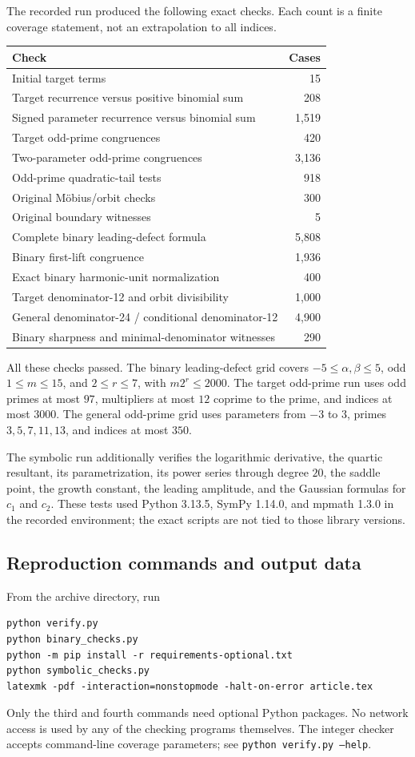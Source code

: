 \documentclass[11pt,a4paper]{article}
\numberwithin{equation}{section}
\theoremstyle{definition}
\theoremstyle{remark}
\begin{document}
The recorded run produced the following exact checks. Each count is a finite
coverage statement, not an extrapolation to all indices.
\begin{center}
\small
\begin{tabular}{p{}r}
\toprule
Check & Cases\\
\midrule
Initial target terms &15\\
Target recurrence versus positive binomial sum &208\\
Signed parameter recurrence versus binomial sum &1,519\\
Target odd-prime congruences &420\\
Two-parameter odd-prime congruences &3,136\\
Odd-prime quadratic-tail tests &918\\
Original M\"obius/orbit checks &300\\
Original boundary witnesses &5\\
\midrule
Complete binary leading-defect formula &5,808\\
Binary first-lift congruence &1,936\\
Exact binary harmonic-unit normalization &400\\
Target denominator-12 and orbit divisibility &1,000\\
General denominator-24 / conditional denominator-12 &4,900\\
Binary sharpness and minimal-denominator witnesses &290\\
\bottomrule
\end{tabular}
\end{center}
All these checks passed. The binary leading-defect grid covers
$-5\le\alpha,\beta\le5$, odd $1\le m\le15$, and $2\le r\le7$, with
$m2^r\le2000$. The target odd-prime run uses odd primes at most $97$,
multipliers at most $12$ coprime to the prime, and indices at most $3000$.
The general odd-prime grid uses parameters from $-3$ to $3$, primes
$3,5,7,11,13$, and indices at most $350$.

The symbolic run additionally verifies the logarithmic derivative, the
quartic resultant, its parametrization, its power series through degree
$20$, the saddle point, the growth constant, the leading amplitude, and the
Gaussian formulas for $c_1$ and $c_2$. These tests used Python 3.13.5,
SymPy 1.14.0, and mpmath 1.3.0 in the recorded environment; the exact scripts
are not tied to those library versions.

\subsection{Reproduction commands and output data}
From the archive directory, run
\begin{lstlisting}
python verify.py
python binary_checks.py
python -m pip install -r requirements-optional.txt
python symbolic_checks.py
latexmk -pdf -interaction=nonstopmode -halt-on-error article.tex
\end{lstlisting}
Only the third and fourth commands need optional Python packages. No network
access is used by any of the checking programs themselves. The integer
checker accepts command-line coverage parameters; see \texttt{python
verify.py --help}.
\end{document}
